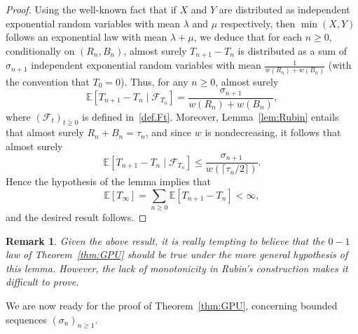 \documentclass[10pt,a4paper]{amsart}
\newtheorem {rem} {Remark} [section]
\newcommand{\1}{{\text{\Large $\mathfrak 1$}}}
\begin{document}
\begin{proof} Using the well-known fact that if $X$ and $Y$ are distributed as independent exponential random variables with mean $\lambda$ and $\mu$ respectively, then $\min(X,Y)$ follows an exponential law with mean $\lambda + \mu$, we deduce that for each $n\ge 0$, conditionally on $(R_n,B_n)$, almost surely $T_{n+1} - T_n$ is distributed as a sum of $\sigma_{n+1}$ independent exponential random variables with mean $\frac 1{w(R_n) + w(B_n)}$ (with the convention that $T_0 = 0$). Thus, for any $n\ge 0$, almost surely 
$$\mathbb E[T_{n+1}  - T_n \mid \mathcal F_{T_n}] = \frac {\sigma_{n+1}}{w(R_n) + w(B_n)},$$
where $(\mathcal F_t)_{t\ge 0}$ is defined in~\eqref{def.Ft}.  
Moreover,  Lemma~\ref{lem:Rubin} entails that almost surely $R_n + B_n = \tau_n$, and since $w$ is nondecreasing, it follows that almost surely 
$$\mathbb E[T_{n+1}  - T_n \mid \mathcal F_{T_n}] \le  \frac {\sigma_{n+1}}{w(\lceil \tau_n/2\rceil)}. $$ 
Hence the hypothesis of the lemma implies that 
$$\mathbb E[T_\infty] = \sum_{n\ge 0} \mathbb E[T_{n+1} - T_n] <\infty, $$
and the desired result follows. 
\end{proof} 

\begin{rem}\label{Rem:weak01} \emph{Given the above result, it is really tempting to believe that the $0-1$ law of Theorem~\ref{thm:GPU} should be true under the more general hypothesis of this lemma. 
However, the lack of monotonicity in Rubin's construction makes it difficult to prove.  }
\end{rem}

We are now ready for the proof of Theorem~\ref{thm:GPU}, concerning bounded sequences $(\sigma_n)_{n\ge 1}$.
 
\end{document}
